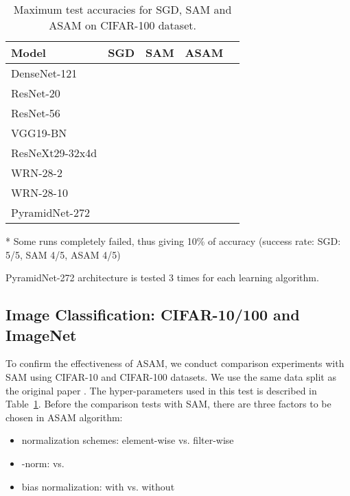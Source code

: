\documentclass{article}
\begin{document}
\begin{table}[t]
\ificml
\else
    \centering
\fi
\begin{threeparttable}
\caption{Maximum test accuracies for SGD, SAM and ASAM on CIFAR-100 dataset. \label{table2}}
\begin{center}
\begin{small}
\begin{tabular}{lcccr}
\toprule
Model & SGD & SAM & ASAM \\
\midrule
DenseNet-121 &  &  &  \\
ResNet-20 &  &  &  \\
ResNet-56 &  &  &  \\
VGG19-BN &  &  &  \\
{\fontsize{8}{9.6}\selectfont ResNeXt29-32x4d} &  &  &  \\
WRN-28-2 &  &  &  \\
WRN-28-10 &  &  &  \\
\midrule
{\fontsize{8.5}{9.6}\selectfont PyramidNet-272} &  &  &  \\
\bottomrule
\end{tabular}
\begin{tablenotes}
\item[*] Some runs completely failed, thus giving 10\% of accuracy (success rate: SGD: 5/5, SAM 4/5, ASAM 4/5)
\item[] PyramidNet-272 architecture is tested 3 times for each learning algorithm.
\end{tablenotes}
\end{small}
\end{center}
\end{threeparttable}
\end{table}


\subsection{Image Classification: CIFAR-10/100 and ImageNet} \label{cifar}
To confirm the effectiveness of ASAM, we conduct comparison experiments with SAM using CIFAR-10 and CIFAR-100 datasets.
We use the same data split as the original paper \citep{krizhevsky2009cifar}. The hyper-parameters used in this test is described in Table~\ref{table2}. Before the comparison tests with SAM, there are three factors to be chosen in ASAM algorithm:
\begin{itemize}
\item normalization schemes: element-wise vs. filter-wise
\item -norm:  vs. 
\item bias normalization: with vs. without
\end{itemize}
\end{document}
